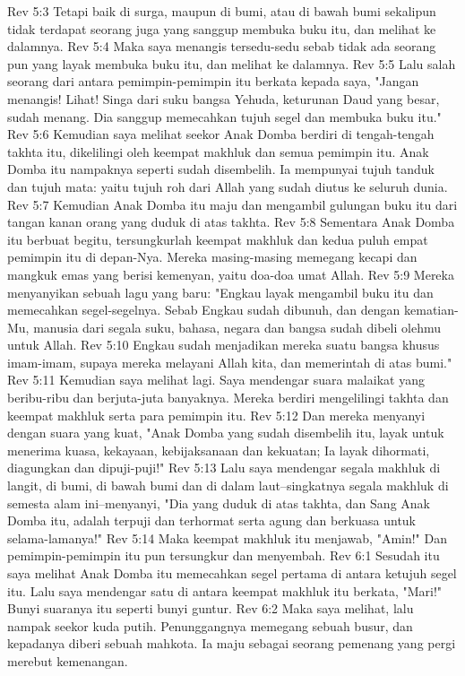 Rev 5:3  Tetapi baik di surga, maupun di bumi, atau di bawah bumi sekalipun tidak terdapat seorang juga yang sanggup membuka buku itu, dan melihat ke dalamnya.
Rev 5:4  Maka saya menangis tersedu-sedu sebab tidak ada seorang pun yang layak membuka buku itu, dan melihat ke dalamnya.
Rev 5:5  Lalu salah seorang dari antara pemimpin-pemimpin itu berkata kepada saya, "Jangan menangis! Lihat! Singa dari suku bangsa Yehuda, keturunan Daud yang besar, sudah menang. Dia sanggup memecahkan tujuh segel dan membuka buku itu."
Rev 5:6  Kemudian saya melihat seekor Anak Domba berdiri di tengah-tengah takhta itu, dikelilingi oleh keempat makhluk dan semua pemimpin itu. Anak Domba itu nampaknya seperti sudah disembelih. Ia mempunyai tujuh tanduk dan tujuh mata: yaitu tujuh roh dari Allah yang sudah diutus ke seluruh dunia.
Rev 5:7  Kemudian Anak Domba itu maju dan mengambil gulungan buku itu dari tangan kanan orang yang duduk di atas takhta.
Rev 5:8  Sementara Anak Domba itu berbuat begitu, tersungkurlah keempat makhluk dan kedua puluh empat pemimpin itu di depan-Nya. Mereka masing-masing memegang kecapi dan mangkuk emas yang berisi kemenyan, yaitu doa-doa umat Allah.
Rev 5:9  Mereka menyanyikan sebuah lagu yang baru: "Engkau layak mengambil buku itu dan memecahkan segel-segelnya. Sebab Engkau sudah dibunuh, dan dengan kematian-Mu, manusia dari segala suku, bahasa, negara dan bangsa sudah dibeli olehmu untuk Allah.
Rev 5:10  Engkau sudah menjadikan mereka suatu bangsa khusus imam-imam, supaya mereka melayani Allah kita, dan memerintah di atas bumi."
Rev 5:11  Kemudian saya melihat lagi. Saya mendengar suara malaikat yang beribu-ribu dan berjuta-juta banyaknya. Mereka berdiri mengelilingi takhta dan keempat makhluk serta para pemimpin itu.
Rev 5:12  Dan mereka menyanyi dengan suara yang kuat, "Anak Domba yang sudah disembelih itu, layak untuk menerima kuasa, kekayaan, kebijaksanaan dan kekuatan; Ia layak dihormati, diagungkan dan dipuji-puji!"
Rev 5:13  Lalu saya mendengar segala makhluk di langit, di bumi, di bawah bumi dan di dalam laut--singkatnya segala makhluk di semesta alam ini--menyanyi, "Dia yang duduk di atas takhta, dan Sang Anak Domba itu, adalah terpuji dan terhormat serta agung dan berkuasa untuk selama-lamanya!"
Rev 5:14  Maka keempat makhluk itu menjawab, "Amin!" Dan pemimpin-pemimpin itu pun tersungkur dan menyembah.
Rev 6:1  Sesudah itu saya melihat Anak Domba itu memecahkan segel pertama di antara ketujuh segel itu. Lalu saya mendengar satu di antara keempat makhluk itu berkata, "Mari!" Bunyi suaranya itu seperti bunyi guntur.
Rev 6:2  Maka saya melihat, lalu nampak seekor kuda putih. Penunggangnya memegang sebuah busur, dan kepadanya diberi sebuah mahkota. Ia maju sebagai seorang pemenang yang pergi merebut kemenangan.
